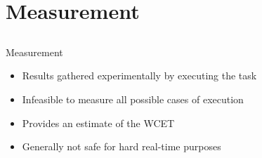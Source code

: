 \documentclass{beamer}
\begin{document}
\section{Measurement}
\subsection{}
\begin{frame}{Measurement}
  \begin{itemize}
    \item Results gathered experimentally by executing the task
    \item Infeasible to measure all possible cases of execution
    \item Provides an estimate of the WCET
    \item Generally not safe for hard real-time purposes
  \end{itemize}
\end{frame}
\end{document}
